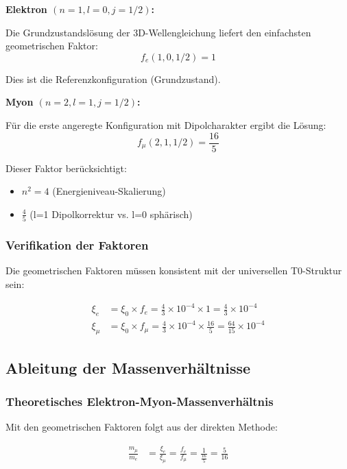 \textbf{Elektron $(n=1, l=0, j=1/2)$:}

Die Grundzustandslösung der 3D-Wellengleichung liefert den einfachsten geometrischen Faktor:
\begin{equation}
	f_e(1,0,1/2) = 1
\end{equation}

Dies ist die Referenzkonfiguration (Grundzustand).

\textbf{Myon $(n=2, l=1, j=1/2)$:}

Für die erste angeregte Konfiguration mit Dipolcharakter ergibt die Lösung:
\begin{equation}
	f_\mu(2,1,1/2) = \frac{16}{5}
\end{equation}

Dieser Faktor berücksichtigt:
\begin{itemize}
	\item $n^2 = 4$ (Energieniveau-Skalierung)
	\item $\frac{4}{5}$ (l=1 Dipolkorrektur vs. l=0 sphärisch)
\end{itemize}

\subsubsection{Verifikation der Faktoren}

Die geometrischen Faktoren müssen konsistent mit der universellen T0-Struktur sein:

\begin{align}
	\xi_e &= \xi_0 \times f_e = \frac{4}{3} \times 10^{-4} \times 1 = \frac{4}{3} \times 10^{-4}\\
	\xi_\mu &= \xi_0 \times f_\mu = \frac{4}{3} \times 10^{-4} \times \frac{16}{5} = \frac{64}{15} \times 10^{-4}
\end{align}

\subsection{Ableitung der Massenverhältnisse}

\subsubsection{Theoretisches Elektron-Myon-Massenverhältnis}

Mit den geometrischen Faktoren folgt aus der direkten Methode:

\begin{align}
	\frac{m_\mu}{m_e} &= \frac{\xi_e}{\xi_\mu} = \frac{f_e}{f_\mu} = \frac{1}{\frac{16}{5}} = \frac{5}{16}
\end{align}

